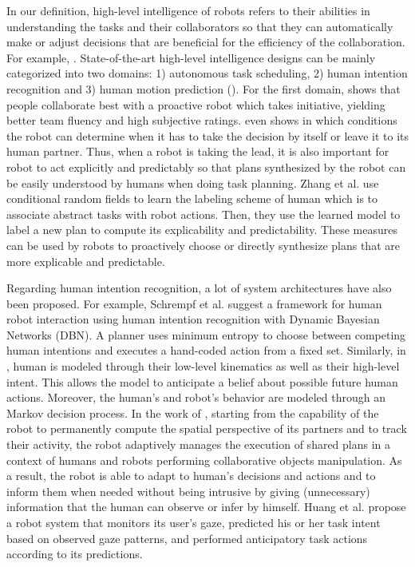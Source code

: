 In our definition, high-level intelligence of robots refers to their abilities in understanding the tasks and their collaborators so that they can automatically make or adjust decisions that are beneficial for the efficiency of the collaboration. For example, . State-of-the-art high-level intelligence designs can be mainly categorized into two domains: 1) autonomous task scheduling, 2) human intention recognition and 3) human motion prediction (). For the first domain, \cite{baraglia2016initiative} shows that people collaborate best with a proactive robot which takes initiative, yielding better team fluency and high subjective ratings. \cite{devin2017decisions} even shows in which conditions the robot can determine when it has to take the decision by itself or leave it to its human partner. Thus, when a robot is taking the lead, it is also important for robot to act explicitly and predictably so that plans synthesized by the robot can be easily understood by humans when doing task planning. Zhang et al. \cite{zhang2017plan} use conditional random fields to learn the labeling scheme of human which is to associate abstract tasks with robot actions. Then, they use the learned model to label a new plan to compute its explicability and predictability. These measures can be used by robots to proactively choose or directly synthesize plans that are more explicable and predictable. 

Regarding human intention recognition,  a lot of system architectures have also been proposed. For example, Schrempf et al. \cite{schrempf2005nove} suggest a framework for human robot interaction using human intention recognition with Dynamic Bayesian Networks (DBN). A planner uses minimum entropy to choose between competing human intentions and executes a hand-coded action from a fixed set. Similarly, in \cite{koppula2016anticipatory}, human is modeled through their low-level kinematics as well as their high-level intent. This allows the model to anticipate a belief about possible future human actions. Moreover, the human’s and robot’s behavior are modeled through an Markov decision process. In  the  work  of \cite{devin2016implemented},  starting  from  the  capability  of  the  robot  to permanently compute the spatial perspective of its partners and to track their activity, the robot adaptively manages the execution of shared  plans  in  a  context  of  humans  and  robots  performing  collaborative  objects  manipulation.  As  a result,  the  robot  is  able  to adapt to human’s decisions and actions and to inform them when needed  without  being  intrusive  by  giving (unnecessary)  information that the human can observe or infer by himself. Huang et al. \cite{huang2016anticipatory} propose a robot system that monitors its user's gaze, predicted his or her task intent based on observed gaze patterns, and performed anticipatory task actions according to its predictions. 


